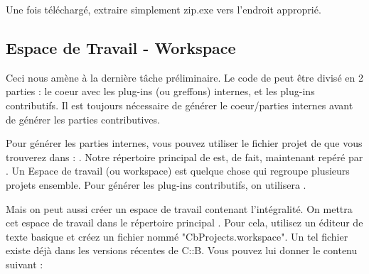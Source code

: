 Une fois téléchargé, extraire simplement zip.exe vers l'endroit approprié.

\subsection{Espace de Travail - Workspace}
Ceci nous amène à la dernière tâche préliminaire. Le code de \codeblocks peut être divisé en 2 parties : le coeur avec les plug-ins (ou greffons) internes, et les plug-ins contributifs. Il est toujours nécessaire de générer le coeur/parties internes avant de générer les parties contributives.

Pour générer les parties internes, vous pouvez utiliser le fichier projet de \codeblocks que vous trouverez dans : . Notre répertoire principal de \codeblocks est, de fait, maintenant repéré par . Un Espace de travail (ou workspace) est quelque chose qui regroupe plusieurs projets ensemble. Pour générer les plug-ins contributifs, on utilisera .

Mais on peut aussi créer un espace de travail contenant l'intégralité. On mettra cet espace de travail dans le répertoire principal . Pour cela, utilisez un éditeur de texte basique et créez un fichier nommé "CbProjects.workspace". Un tel fichier existe déjà dans les versions récentes de C::B. Vous pouvez lui donner le contenu suivant : 

